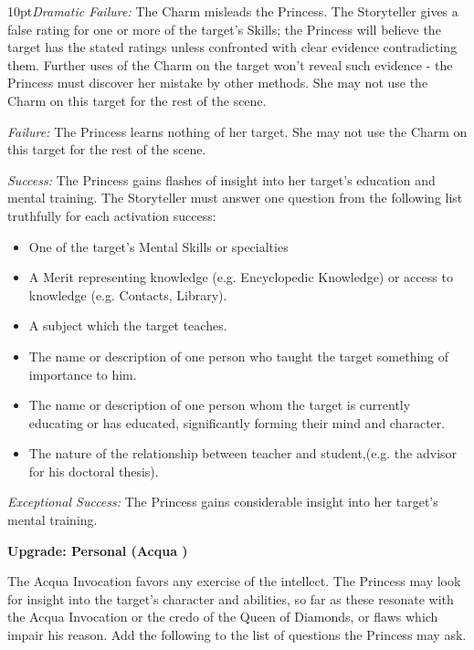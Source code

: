 \begin{myindentpar}{10pt}\emph{Dramatic Failure:} The Charm misleads the Princess. The Storyteller gives a false rating for one or more of the target's Skills; the Princess will believe the target has the stated ratings unless confronted with clear evidence contradicting them. Further uses of the Charm on the target won't reveal such evidence - the Princess must discover her mistake by other methods. She may not use the Charm on this target for the rest of the scene.

\emph{Failure:} The Princess learns nothing of her target. She may not use the Charm on this target for the rest of the scene.

\emph{Success:} The Princess gains flashes of insight into her target's education and mental training. The Storyteller must answer one question from the following list truthfully for each activation success:

\begin{itemize}
 \item One of the target's Mental Skills or specialties
 \item A Merit representing knowledge (e.g. Encyclopedic Knowledge) or access to knowledge (e.g. Contacts, Library).
 \item A subject which the target teaches. 
 \item The name or description of one person who taught the target something of importance to him. 
 \item The name or description of one person whom the target is currently educating or has educated, significantly forming their mind and character.
 \item The nature of the relationship between teacher and student,(e.g. the advisor for his doctoral thesis).
\end{itemize}

\emph{Exceptional Success:} The Princess gains considerable insight into her target's mental training.

\textbf{Upgrade: Personal (Acqua \textbullet\textbullet)}

The Acqua Invocation favors any exercise of the intellect. The Princess may look for insight into the target's character and abilities, so far as these resonate with the Acqua Invocation or the credo of the Queen of Diamonds, or flaws which impair his reason. Add the following to the list of questions the Princess may ask.\end{myindentpar}

